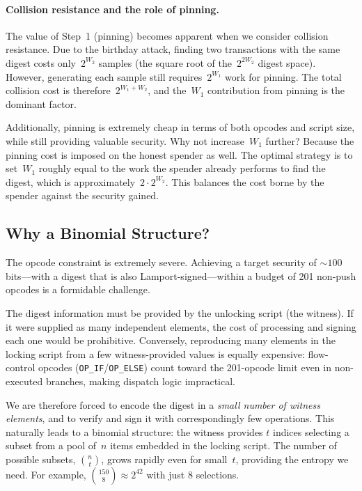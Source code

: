 \documentclass[11pt, a4paper]{article}
\begin{document}
\paragraph{Collision resistance and the role of pinning.}
The value of Step~1 (pinning) becomes apparent when we consider collision resistance. Due to the birthday attack, finding two transactions with the same digest costs only~$2^{W_2}$ samples (the square root of the~$2^{2W_2}$ digest space). However, generating each sample still requires~$2^{W_1}$ work for pinning. The total collision cost is therefore~$2^{W_1 + W_2}$, and the~$W_1$ contribution from pinning is the dominant factor.

Additionally, pinning is extremely cheap in terms of both opcodes and script size, while still providing valuable security. Why not increase~$W_1$ further? Because the pinning cost is imposed on the honest spender as well. The optimal strategy is to set~$W_1$ roughly equal to the work the spender already performs to find the digest, which is approximately~$2 \cdot 2^{W_2}$. This balances the cost borne by the spender against the security gained.

\subsection{Why a Binomial Structure?}
\label{sec:binomial-intuition}

The opcode constraint is extremely severe. Achieving a target security of ${\sim}100$ bits---with a digest that is also Lamport-signed---within a budget of 201 non-push opcodes is a formidable challenge.

The digest information must be provided by the unlocking script (the witness). If it were supplied as many independent elements, the cost of processing and signing each one would be prohibitive. Conversely, reproducing many elements in the locking script from a few witness-provided values is equally expensive: flow-control opcodes (\texttt{OP\_IF}/\texttt{OP\_ELSE}) count toward the 201-opcode limit even in non-executed branches, making dispatch logic impractical.

We are therefore forced to encode the digest in a \emph{small number of witness elements}, and to verify and sign it with correspondingly few operations. This naturally leads to a binomial structure: the witness provides $t$ indices selecting a subset from a pool of~$n$ items embedded in the locking script. The number of possible subsets, $\binom{n}{t}$, grows rapidly even for small~$t$, providing the entropy we need. For example, $\binom{150}{8} \approx 2^{42}$ with just 8 selections.
\end{document}
